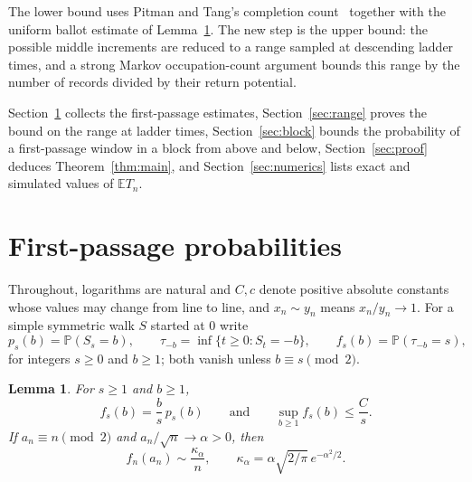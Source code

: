 \documentclass[11pt]{amsart}
\newtheorem{lemma}[theorem]{Lemma}
\theoremstyle{remark}
\numberwithin{equation}{section}
\newcommand{\PP}{\mathbb{P}}
\newcommand{\EE}{\mathbb{E}}
\begin{document}
The lower bound uses Pitman and Tang's completion count~\cite[(2.21)]{PT} together with the uniform ballot estimate of Lemma~\ref{lem:fp}. The new step is the upper bound: the possible middle increments are reduced to a range sampled at descending ladder times, and a strong Markov occupation-count argument bounds this range by the number of records divided by their return potential.

Section~\ref{sec:fp} collects the first-passage estimates, Section~\ref{sec:range} proves the bound on the range at ladder times, Section~\ref{sec:block} bounds the probability of a first-passage window in a block from above and below, Section~\ref{sec:proof} deduces Theorem~\ref{thm:main}, and Section~\ref{sec:numerics} lists exact and simulated values of $\EE T_n$.

\section{First-passage probabilities}\label{sec:fp}

Throughout, logarithms are natural and $C,c$ denote positive absolute constants whose values may change from line to line, and $x_n\sim y_n$ means $x_n/y_n\to1$. For a simple symmetric walk $S$ started at $0$ write
\[
p_s(b)=\PP(S_s=b),\qquad \tau_{-b}=\inf\{t\ge0:S_t=-b\},\qquad f_s(b)=\PP(\tau_{-b}=s),
\]
for integers $s\ge0$ and $b\ge1$; both vanish unless $b\equiv s\pmod2$.

\begin{lemma}\label{lem:fp}
For $s\ge1$ and $b\ge1$,
\begin{equation}\label{eq:ballot}
f_s(b)=\frac bs\,p_s(b)\qquad\text{and}\qquad\sup_{b\ge1}f_s(b)\le\frac Cs.
\end{equation}
If $a_n\equiv n\pmod2$ and $a_n/\sqrt n\to\alpha>0$, then
\begin{equation}\label{eq:fpasym}
f_n(a_n)\sim\frac{\kappa_\alpha}n,\qquad\kappa_\alpha=\alpha\sqrt{2/\pi}\,e^{-\alpha^2/2}.
\end{equation}
\end{lemma}
\end{document}
